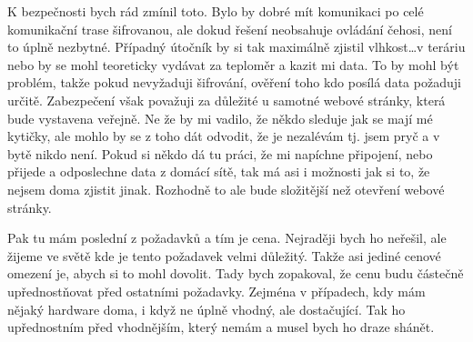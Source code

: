 K bezpečnosti bych rád zmínil toto. Bylo by dobré mít komunikaci po celé komunikační trase šifrovanou, ale dokud řešení 
neobsahuje ovládání čehosi, není to úplně nezbytné. Případný útočník by si tak maximálně zjistil vlhkost\ldots v teráriu
nebo by se mohl teoreticky vydávat za teploměr a kazit mi data. To by mohl být problém, takže pokud nevyžaduji 
šifrování, ověření toho kdo posílá data požaduji určitě. Zabezpečení však považuji za důležité u samotné webové stránky, 
která bude vystavena veřejně. Ne že by mi vadilo, že někdo sleduje jak se mají mé kytičky, ale mohlo by se z toho dát 
odvodit, že je nezalévám tj. jsem pryč a v bytě nikdo není. Pokud si někdo dá tu práci, že mi napíchne připojení, nebo 
přijede a odposlechne data z domácí sítě, tak má asi i možnosti jak si to, že nejsem doma zjistit jinak. Rozhodně to ale 
bude složitější než otevření webové stránky.

Pak tu mám poslední z požadavků a tím je cena. Nejraději bych ho neřešil, ale žijeme ve světě kde je tento požadavek 
velmi důležitý. Takže asi jediné cenové omezení je, abych si to mohl dovolit. Tady bych zopakoval, že cenu budu částečně 
upřednostňovat před ostatními požadavky. Zejména v případech, kdy mám nějaký hardware doma, i když ne úplně vhodný, ale 
dostačující. Tak ho upřednostním před vhodnějším, který nemám a musel bych ho draze shánět.
